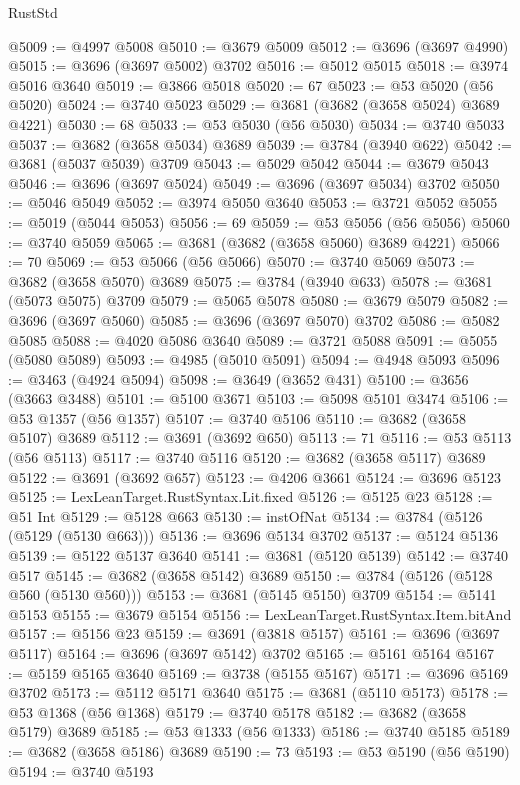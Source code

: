 \begin{lexlean}{RustStd}
\begin{coremodule}
@5009 := @4997 @5008
@5010 := @3679 @5009
@5012 := @3696 (@3697 @4990)
@5015 := @3696 (@3697 @5002) @3702
@5016 := @5012 @5015
@5018 := @3974 @5016 @3640
@5019 := @3866 @5018
@5020 := 67
@5023 := @53 @5020 (@56 @5020)
@5024 := @3740 @5023
@5029 := @3681 (@3682 (@3658 @5024) @3689 @4221)
@5030 := 68
@5033 := @53 @5030 (@56 @5030)
@5034 := @3740 @5033
@5037 := @3682 (@3658 @5034) @3689
@5039 := @3784 (@3940 @622)
@5042 := @3681 (@5037 @5039) @3709
@5043 := @5029 @5042
@5044 := @3679 @5043
@5046 := @3696 (@3697 @5024)
@5049 := @3696 (@3697 @5034) @3702
@5050 := @5046 @5049
@5052 := @3974 @5050 @3640
@5053 := @3721 @5052
@5055 := @5019 (@5044 @5053)
@5056 := 69
@5059 := @53 @5056 (@56 @5056)
@5060 := @3740 @5059
@5065 := @3681 (@3682 (@3658 @5060) @3689 @4221)
@5066 := 70
@5069 := @53 @5066 (@56 @5066)
@5070 := @3740 @5069
@5073 := @3682 (@3658 @5070) @3689
@5075 := @3784 (@3940 @633)
@5078 := @3681 (@5073 @5075) @3709
@5079 := @5065 @5078
@5080 := @3679 @5079
@5082 := @3696 (@3697 @5060)
@5085 := @3696 (@3697 @5070) @3702
@5086 := @5082 @5085
@5088 := @4020 @5086 @3640
@5089 := @3721 @5088
@5091 := @5055 (@5080 @5089)
@5093 := @4985 (@5010 @5091)
@5094 := @4948 @5093
@5096 := @3463 (@4924 @5094)
@5098 := @3649 (@3652 @431)
@5100 := @3656 (@3663 @3488)
@5101 := @5100 @3671
@5103 := @5098 @5101 @3474
@5106 := @53 @1357 (@56 @1357)
@5107 := @3740 @5106
@5110 := @3682 (@3658 @5107) @3689
@5112 := @3691 (@3692 @650)
@5113 := 71
@5116 := @53 @5113 (@56 @5113)
@5117 := @3740 @5116
@5120 := @3682 (@3658 @5117) @3689
@5122 := @3691 (@3692 @657)
@5123 := @4206 @3661
@5124 := @3696 @5123
@5125 := LexLeanTarget.RustSyntax.Lit.fixed
@5126 := @5125 @23
@5128 := @51 Int
@5129 := @5128 @663
@5130 := instOfNat
@5134 := @3784 (@5126 (@5129 (@5130 @663)))
@5136 := @3696 @5134 @3702
@5137 := @5124 @5136
@5139 := @5122 @5137 @3640
@5141 := @3681 (@5120 @5139)
@5142 := @3740 @517
@5145 := @3682 (@3658 @5142) @3689
@5150 := @3784 (@5126 (@5128 @560 (@5130 @560)))
@5153 := @3681 (@5145 @5150) @3709
@5154 := @5141 @5153
@5155 := @3679 @5154
@5156 := LexLeanTarget.RustSyntax.Item.bitAnd
@5157 := @5156 @23
@5159 := @3691 (@3818 @5157)
@5161 := @3696 (@3697 @5117)
@5164 := @3696 (@3697 @5142) @3702
@5165 := @5161 @5164
@5167 := @5159 @5165 @3640
@5169 := @3738 (@5155 @5167)
@5171 := @3696 @5169 @3702
@5173 := @5112 @5171 @3640
@5175 := @3681 (@5110 @5173)
@5178 := @53 @1368 (@56 @1368)
@5179 := @3740 @5178
@5182 := @3682 (@3658 @5179) @3689
@5185 := @53 @1333 (@56 @1333)
@5186 := @3740 @5185
@5189 := @3682 (@3658 @5186) @3689
@5190 := 73
@5193 := @53 @5190 (@56 @5190)
@5194 := @3740 @5193

\end{coremodule}
\end{lexlean}
